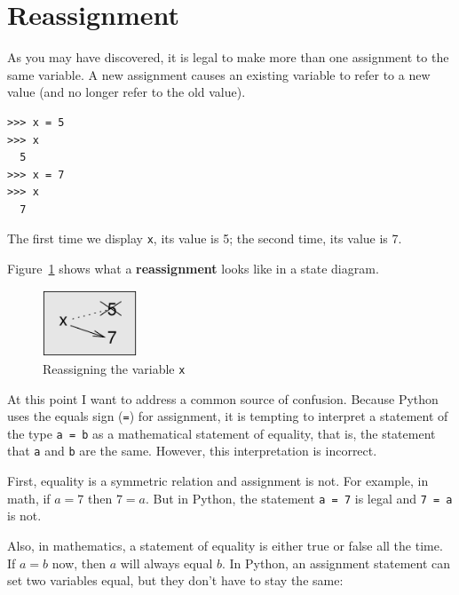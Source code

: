 \section{Reassignment}


As you may have discovered, it is legal to make more than one assignment to the same variable. A new assignment causes an existing variable to refer to a new value (and no longer refer to the old value).

\begin{Verbatim}[frame=single]
>>> x = 5
>>> x
  5
>>> x = 7
>>> x
  7
\end{Verbatim}
%
The first time we display \texttt{x}, its value is 5; the second time, its value is 7.

Figure~\ref{fig.assign2} shows what a {\bf reassignment} looks like in a state diagram.  

\begin{figure}[H]
\begin{center}
\includegraphics[width=0.25\textwidth]{images/assign2.pdf}
\end{center}
\caption{Reassigning the variable \texttt{x}}
\label{fig.assign2}
\end{figure}

At this point I want to address a common source of confusion. Because Python uses the equals sign (\texttt{=}) for assignment, it is tempting to interpret a statement of the type \texttt{a = b} as a mathematical statement of equality, that is, the statement that \texttt{a} and \texttt{b} are the same. However, this interpretation is incorrect.

First, equality is a symmetric relation and assignment is not. For example, in math, if $a=7$ then $7=a$. But in Python, the statement \texttt{a = 7} is legal and \texttt{7 = a} is not.

Also, in mathematics, a statement of equality is either true or false all the time. If $a=b$ now, then $a$ will always equal $b$. In Python, an assignment statement can set two variables equal, but they don't have to stay the same:

